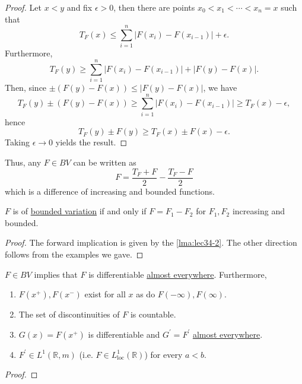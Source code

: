 \begin{proof}
	Let \(x < y\) and fix \(\epsilon > 0\), then there are points \(x_0 < x_1 < \cdots < x_n = x\) such that
	\[
		T_F(x) \leq \sum_{i=1}^n \left\vert F(x_i) - F(x_{i-1}) \right\vert + \epsilon.
	\]
	Furthermore,
	\[
		T_F(y) \geq \sum_{i=1}^n \left\vert F(x_i) - F(x_{i-1}) \right\vert + \left\vert F(y) - F(x) \right\vert .
	\]
	Then, since \(\pm(F(y) - F(x)) \leq \left\vert F(y) - F(x) \right\vert \), we have
	\[
		T_F(y) \pm (F(y) - F(x)) \geq \sum_{i=1}^n \left\vert F(x_i) - F(x_{i-1}) \right\vert \geq T_F(x) - \epsilon,
	\]
	hence
	\[
		T_F(y) \pm F(y) \geq T_F(x) \pm F(x) - \epsilon.
	\]
	Taking \(\epsilon \to 0\) yields the result.
\end{proof}
\begin{remark}
	Thus, any \(F \in BV\) can be written as
	\[
		F = \frac{T_F + F}{2} - \frac{T_F - F}{2}
	\]
	which is a difference of increasing and bounded functions.
\end{remark}

\begin{theorem}
	\(F\) is of \hyperref[def:bounded-variation]{bounded variation} if and only if \(F = F_1 - F_2\) for \(F_1,F_2\) increasing and bounded.
\end{theorem}
\begin{proof}
	The forward implication is given by the \autoref{lma:lec34-2}. The other direction follows from the examples we gave.
\end{proof}

\begin{corollary}\label{col:bounded-variation-differentiation}
	\(F \in BV\) implies that \(F\) is differentiable \hyperref[def:mu-almost-everywhere]{almost everywhere}. Furthermore,
	\begin{enumerate}
		\item \(F(x^+),F(x^-)\) exist for all \(x\) as do \(F(-\infty),F(\infty)\).
		\item The set of discontinuities of \(F\) is countable.
		\item \(G(x) = F(x^+)\) is differentiable and \(G^\prime = F^\prime\) \hyperref[def:mu-almost-everywhere]{almost everywhere}.
		\item \(F^\prime \in L^1(\mathbb{R}, m)\) (i.e. \(F \in L^1_{\operatorname{loc}}(\mathbb{R})\)) for every \(a < b\).
	\end{enumerate}
\end{corollary}
\begin{proof}
\end{proof}